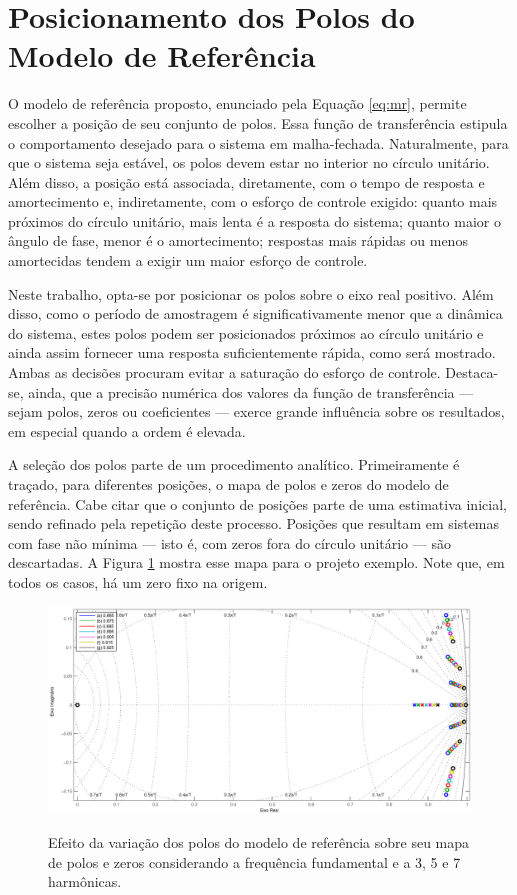 \documentclass[repeatfields,oneside]{tcc}
\begin{document}
\section{Posicionamento dos Polos do Modelo de Referência}

O modelo de referência proposto, enunciado pela Equação \eqref{eq:mr}, permite escolher a posição de seu conjunto de polos.
Essa função de transferência estipula o comportamento desejado para o sistema em malha-fechada.
Naturalmente, para que o sistema seja estável, os polos devem estar no interior no círculo unitário.
Além disso, a posição está associada, diretamente, com o tempo de resposta e amortecimento e, indiretamente, com o esforço de controle exigido:
quanto mais próximos do círculo unitário, mais lenta é a resposta do sistema;
quanto maior o ângulo de fase, menor é o amortecimento;
respostas mais rápidas ou menos amortecidas tendem a exigir um maior esforço de controle.

Neste trabalho, opta-se por posicionar os polos sobre o eixo real positivo.
Além disso, como o período de amostragem é significativamente menor que a dinâmica do sistema, estes polos podem ser posicionados próximos ao círculo unitário e ainda assim fornecer uma resposta suficientemente rápida, como será mostrado.
Ambas as decisões procuram evitar a saturação do esforço de controle.
Destaca-se, ainda, que a precisão numérica dos valores da função de transferência --- sejam polos, zeros ou coeficientes --- exerce grande influência sobre os resultados, em especial quando a ordem é elevada.

A seleção dos polos parte de um procedimento analítico.
Primeiramente é traçado, para diferentes posições, o mapa de polos e zeros do modelo de referência.
Cabe citar que o conjunto de posições parte de uma estimativa inicial, sendo refinado pela repetição deste processo.
Posições que resultam em sistemas com fase não mínima --- isto é, com zeros fora do círculo unitário --- são descartadas.
A Figura \ref{fig:pz_M_7} mostra esse mapa para o projeto exemplo.
Note que, em todos os casos, há um zero fixo na origem.

\begin{figure}[h]
    \centering
    \caption{Efeito da variação dos polos do modelo de referência sobre seu mapa de polos e zeros considerando a frequência fundamental e a 3{\textordfeminine}, 5{\textordfeminine} e 7{\textordfeminine} harmônicas.}
    \includegraphics[trim={80 25 80 43}, clip, width=0.78\linewidth]{fig/pz_M_7.eps}
    \\
    \label{fig:pz_M_7}
\end{figure}
\end{document}
